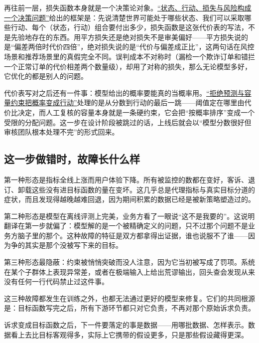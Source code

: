 再往前一层，损失函数本身就是一个决策论对象。\hyperref[sec:11-Mathematical-Statistics/07-Statistical-Decision-and-Reliable-Prediction/01]{``状态、行动、损失与风险构成一个决策问题''}给出的框架是：先说清楚世界可能处于哪些状态、我们可以采取哪些行动、每个（状态，行动）组合要付出多少，损失函数是这张代价表的写法，不是先验地存在的东西。用平方损失还是绝对损失不是审美偏好——平方损失说的是``偏差两倍时代价四倍''，绝对损失说的是``代价与偏差成正比''，这两句话在风控场景和推荐场景里的真假完全不同。误判成本不对称时（漏检一个欺诈订单和错拦一个正常订单的代价相差两个数量级），却用了对称的损失，那么无论模型多好，它优化的都是别人的问题。

代价表写对之后还有一件事：模型给出的概率要能真的当概率用。\hyperref[sec:11-Mathematical-Statistics/07-Statistical-Decision-and-Reliable-Prediction/06]{``拒绝预测与容量约束把概率变成行动''}处理的是从分数到行动的最后一跳——阈值定在哪里由代价比决定，而人工复核的容量本身就是一条硬约束，它会把``按概率排序''变成一个受限的分配问题。这一步在设计阶段被跳过的话，上线后就会以``模型分数很好但审核团队根本处理不完''的形式回来。

\subsection{这一步做错时，故障长什么样}

第一种形态是指标全线上涨而用户体验下降。所有被监控的数都在变好，客诉、退订、卸载这些没有进目标函数的量在变坏。这几乎总是代理指标与真实目标分道的症状，而且发现得越晚越难回退，因为期间积累的数据已经是被新策略塑造过的。

第二种形态是模型在离线评测上完美，业务方看了一眼说``这不是我要的''。这说明翻译在第一步就偏了：模型解的是一个被精确定义的问题，只不过那个问题不是业务方脑子里的那个。这种故障的特征是双方都拿得出证据，谁也说服不了谁——因为争的其实是那个没被写下来的目标。

第三种形态最隐蔽：约束被悄悄突破而没人注意，因为它当初被写成了罚项。系统在某个子群体上表现异常差，或者在极端输入上给出荒谬输出，回头查会发现从来没有任何一行代码禁止过这件事。

这三种故障都发生在训练之外，也都无法通过更好的模型来修复。它们的共同根源是：目标函数写完之后，所有下游环节都只对它负责，不再对那个原始诉求负责。

诉求变成目标函数之后，下一件要落定的事是数据——用哪批数据、怎样表示。数据看上去比目标客观得多，实际上它携带的假设更多，只是那些假设藏得更深。
